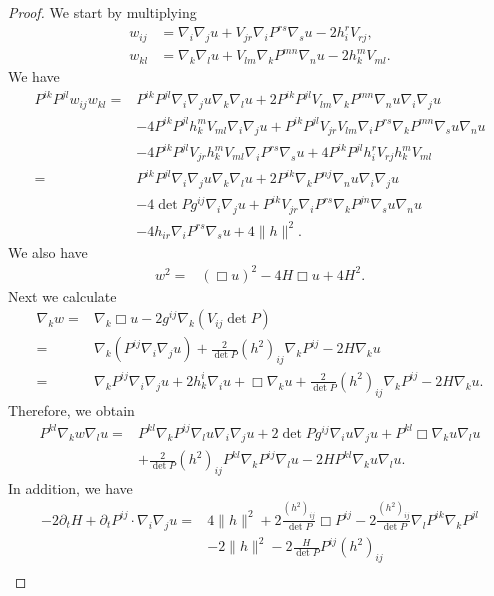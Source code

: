 \documentclass{amsart}
\theoremstyle{definition}
\theoremstyle{remark}
\numberwithin{equation}{section}
\begin{document}
\begin{proof}
We start by multiplying
\begin{align*}
w_{ij}&=\nabla_i\nabla_ju+V_{jr}\nabla_iP^{rs}\nabla_su-2h_i^rV_{rj},\\
w_{kl}&=\nabla_k\nabla_lu+V_{lm}\nabla_kP^{mn}\nabla_nu-2h_k^mV_{ml}.
\end{align*}
We have
\begin{align*}
P^{ik}P^{jl}w_{ij}w_{kl}=&P^{ik}P^{jl}\nabla_i\nabla_ju\nabla_k\nabla_lu+2P^{ik}P^{jl}V_{lm}\nabla_kP^{mn}\nabla_nu\nabla_i\nabla_ju\\
&-4P^{ik}P^{jl}h_k^mV_{ml}\nabla_i\nabla_ju+P^{ik}P^{jl}V_{jr}V_{lm}\nabla_iP^{rs}\nabla_kP^{mn}\nabla_su\nabla_nu\\
&-4P^{ik}P^{jl}V_{jr}h_k^mV_{ml}\nabla_iP^{rs}\nabla_su+4P^{ik}P^{jl}h_i^rV_{rj}h_k^mV_{ml}\\
=&P^{ik}P^{jl}\nabla_i\nabla_ju\nabla_k\nabla_lu+2P^{ik}\nabla_kP^{nj}\nabla_nu\nabla_i\nabla_ju\\
&-4\det P g^{ij}\nabla_i\nabla_ju+P^{ik}V_{jr}\nabla_iP^{rs}\nabla_kP^{jn}\nabla_su\nabla_nu\\
&-4h_{ir}\nabla_iP^{rs}\nabla_su+4\|h\|^2.
\end{align*}
We also have
\begin{align*}
w^2=&(\Box u)^2-4H\Box u+4H^2.
\end{align*}
Next we calculate
\begin{align*}
\nabla_k w=&\nabla_k\Box u-2g^{ij}\nabla_k(V_{ij}\det P)\\
=&\nabla_k(P^{ij}\nabla_i\nabla_j u)+\frac{2}{\det P}(h^2)_{ij}\nabla_kP^{ij}-2H\nabla_ku\\
=&\nabla_kP^{ij}\nabla_i\nabla_ju+2h_k^i\nabla_iu+\Box\nabla_ku+\frac{2}{\det P}(h^2)_{ij}\nabla_kP^{ij}-2H\nabla_ku.
\end{align*}
Therefore, we obtain
\begin{align*}
P^{kl}\nabla_k w\nabla_lu
=&P^{kl}\nabla_kP^{ij}\nabla_lu\nabla_i\nabla_ju+2\det Pg^{ij}\nabla_iu\nabla_ju+P^{kl}\Box\nabla_ku\nabla_lu\\
&+\frac{2}{\det P}(h^2)_{ij}P^{kl}\nabla_kP^{ij}\nabla_lu-2HP^{kl}\nabla_ku\nabla_lu.
\end{align*}
In addition, we have
\begin{align*}
-2\partial_tH+\partial_tP^{ij}\cdot\nabla_i\nabla_ju=&4\|h\|^2+2\frac{(h^2)_{ij}}{\det P}\Box P^{ij}-2\frac{(h^2)_{ij}}{\det P}\nabla_lP^{ik}\nabla_kP^{jl}\\
&-2\|h\|^2-2\frac{H}{\det P}P^{ij}(h^2)_{ij}\\

\end{align*}
\end{proof}
\end{document}
